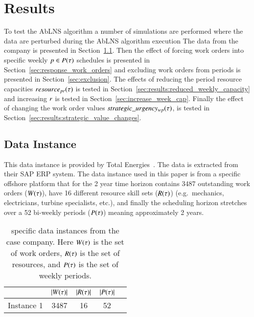 \section{Results}\label{sec:3-results}
To test the AbLNS algorithm a number of simulations are performed where the
data are perturbed during the AbLNS algorithm execution The data from the
company is presented in Section~\ref{sec:data_instance}. Then the effect of
forcing work orders into specific weekly  $p \in P(\tau)$
schedules is presented in Section~\ref{sec:response_work_orders}  and excluding
work orders from periods is presented in Section~\ref{sec:exclusion}. The
effects of reducing the period resource capacities $\ParStrategicResource$ is
tested in Section~\ref{sec:results:reduced_weekly_capacity} and increasing $
r$ is tested in  Section~\ref{sec:increase_week_cap}.  Finally
the effect of changing the work order values $strategic\_urgency_{w p}(\tau)$,  is tested
in Section~\ref{sec:results:strategic_value_changes}.

\subsection{Data Instance}\label{sec:data_instance}
This data instance is provided by Total Energies~\citep{total-energies}. The data
is extracted from their SAP ERP system. The data instance used in this paper
is from a specific offshore platform that for  the 2 year time horizon contains
3487 outstanding work orders ($W(\tau)$), have 16 different resource
skill sets ($R(\tau)$) (e.g.\ mechanics, electricians,  turbine specialists,
etc.), and finally the scheduling horizon stretches over a 52 bi-weekly periods
($P(\tau)$) meaning approximately 2 years.
 
\begin{table}[H]
\centering
\begin{tabular}{ccccc}
\toprule
           & $|W(\tau)|$ & $|R(\tau)|$ & $|P(\tau)|$ \\ \midrule
Instance 1 & 3487                & 16               & 52             \\ \bottomrule
\end{tabular}

\caption{specific data instances from the case company. Here $\SetWorkOrder$ is the set of work orders, $R(\tau)$ is the set of resources, and $P(\tau)$ is the set of weekly periods.} %
\end{table}

